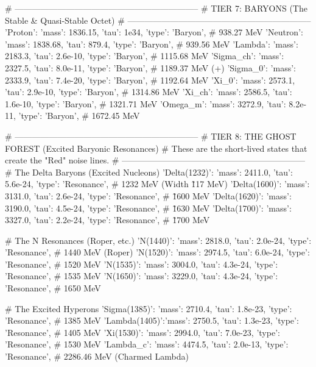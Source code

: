 {    \# \------------------------------------------------------------------  
    \# TIER 7: BARYONS (The Stable & Quasi-Stable Octet)  
    \# \------------------------------------------------------------------  
    'Proton':      {'mass': 1836.15,       'tau': 1e34,      'type': 'Baryon'},    \# 938.27 MeV  
    'Neutron':     {'mass': 1838.68,       'tau': 879.4,     'type': 'Baryon'},    \# 939.56 MeV  
    'Lambda':      {'mass': 2183.3,        'tau': 2.6e-10,   'type': 'Baryon'},    \# 1115.68 MeV  
    'Sigma\_ch':    {'mass': 2327.5,        'tau': 8.0e-11,   'type': 'Baryon'},    \# 1189.37 MeV (+)  
    'Sigma\_0':     {'mass': 2333.9,        'tau': 7.4e-20,   'type': 'Baryon'},    \# 1192.64 MeV  
    'Xi\_0':        {'mass': 2573.1,        'tau': 2.9e-10,   'type': 'Baryon'},    \# 1314.86 MeV  
    'Xi\_ch':       {'mass': 2586.5,        'tau': 1.6e-10,   'type': 'Baryon'},    \# 1321.71 MeV  
    'Omega\_m':     {'mass': 3272.9,        'tau': 8.2e-11,   'type': 'Baryon'},    \# 1672.45 MeV

    \# \------------------------------------------------------------------  
    \# TIER 8: THE GHOST FOREST (Excited Baryonic Resonances)  
    \# These are the short-lived states that create the "Red" noise lines.  
    \# \------------------------------------------------------------------  
    \# The Delta Baryons (Excited Nucleons)  
    'Delta(1232)': {'mass': 2411.0,        'tau': 5.6e-24,   'type': 'Resonance'}, \# 1232 MeV (Width \~117 MeV)  
    'Delta(1600)': {'mass': 3131.0,        'tau': 2.6e-24,   'type': 'Resonance'}, \# \~1600 MeV  
    'Delta(1620)': {'mass': 3190.0,        'tau': 4.5e-24,   'type': 'Resonance'}, \# \~1630 MeV  
    'Delta(1700)': {'mass': 3327.0,        'tau': 2.2e-24,   'type': 'Resonance'}, \# \~1700 MeV

    \# The N Resonances (Roper, etc.)  
    'N(1440)':     {'mass': 2818.0,        'tau': 2.0e-24,   'type': 'Resonance'}, \# 1440 MeV (Roper)  
    'N(1520)':     {'mass': 2974.5,        'tau': 6.0e-24,   'type': 'Resonance'}, \# 1520 MeV  
    'N(1535)':     {'mass': 3004.0,        'tau': 4.3e-24,   'type': 'Resonance'}, \# 1535 MeV  
    'N(1650)':     {'mass': 3229.0,        'tau': 4.3e-24,   'type': 'Resonance'}, \# 1650 MeV

    \# The Excited Hyperons  
    'Sigma(1385)': {'mass': 2710.4,        'tau': 1.8e-23,   'type': 'Resonance'}, \# 1385 MeV  
    'Lambda(1405)':{'mass': 2750.5,        'tau': 1.3e-23,   'type': 'Resonance'}, \# 1405 MeV  
    'Xi(1530)':    {'mass': 2994.0,        'tau': 7.0e-23,   'type': 'Resonance'}, \# 1530 MeV  
    'Lambda\_c':    {'mass': 4474.5,        'tau': 2.0e-13,   'type': 'Resonance'}, \# 2286.46 MeV (Charmed Lambda)  
}  